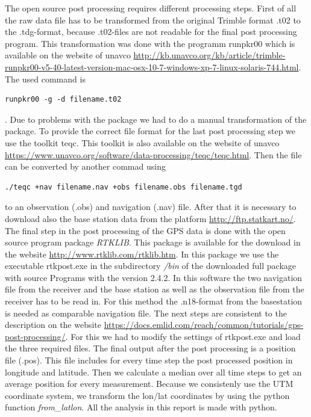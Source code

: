 The open source post processing requires different processing steps.
First of all the raw data file has to be transformed from the original Trimble format .t02 to the .tdg-format, because .t02-files are not readable for the final post processing program.
This transformation was done with the programm  runpkr00  which is available on the website of unavco \url{http://kb.unavco.org/kb/article/trimble-runpkr00-v5-40-latest-version-mac-osx-10-7-windows-xp-7-linux-solaris-744.html}.
The used command is 
\begin{verbatim} 
runpkr00 -g -d filename.t02 
\end{verbatim}.
Due to problems with the package we had to do a manual transformation of the package.
To provide the correct file format for the last post processing step we use the toolkit teqc.
This toolkit is also available on the website of unavco \url{https://www.unavco.org/software/data-processing/teqc/teqc.html}.
Then the file can be converted by another commad using
\begin{verbatim}
./teqc +nav filename.nav +obs filename.obs filename.tgd
\end{verbatim} 
to an observation (.obs) and navigation (.nav) file.
After that it is necessary to download also the base station data from the platform \url{http://ftp.statkart.no/}.
The final step in the post processing of the GPS data is done with the open source program package \textit{RTKLIB}.
This package is available for the download in the website \url{http://www.rtklib.com/rtklib.htm}.
In this package we use the executable rtkpost.exe in the subdirectory \textit{/bin} of the downloaded full package with source Programs with the version 2.4.2.
In this software the two navigation file from the receiver and the base station as well as the observation file from the receiver has to be read in.
For this method the .n18-format from the basestation is needed as comparable navigation file.
The next steps are consistent to the description on the website \url{https://docs.emlid.com/reach/common/tutorials/gps-post-processing/}.
For this we had to modify the settings of rtkpost.exe and load the three required files. 
The final output after the post processing is a position file (.pos). 
This file includes for every time step the post processed position in longitude and latitude.
Then we calculate a median over all time steps to get an average position for every measurement.
Because we consistenly use the UTM coordinate system, we transform the lon/lat coordinates by using the python function \textit{from\_latlon}.
All the analysis in this report is made with python.
\medskip


